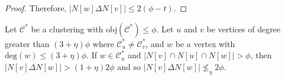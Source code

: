 \begin{proof}
Therefore, $|N[w] \Delta N[v]|\leq 2(\phi - t)$.
\end{proof}


\begin{lemma}\label{lem:nostealinghard}
Let $\mathcal{C}^\ast$ be a clustering with $\text{obj}(\mathcal{C}^{*}) \le \phi.$ Let $u$ and $v$ be vertices of degree greater than $(3+\eta)\phi$ where $\mathcal{C}^{*}_u \neq \mathcal{C}^{*}_v$, and $w$ be a vertex with $\text{deg}(w) \leq (3+\eta)\phi$. If $w \in \mathcal{C}^{*}_u$ and $|N[v] \cap N[u] \cap N[w]| > \phi$, then $|N[v] \Delta N[w]| > (1+\eta)2\phi$ and so $|N[v] \Delta N[w]| \nleq_{\eta} 2\phi$.
\end{lemma}
    
    
    
    
    
    

